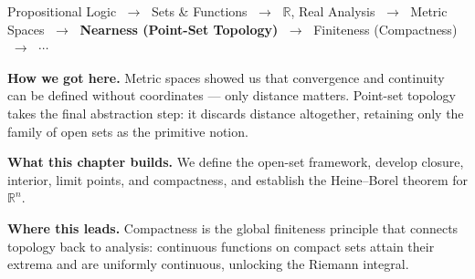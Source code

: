 
\begin{tcolorbox}[
  colback=gray!6,
  colframe=gray!40,
  arc=2pt,
  left=8pt, right=8pt, top=6pt, bottom=6pt,
  title={\small\textbf{Where You Are in the Journey}},
  fonttitle=\small\bfseries
]
\begin{center}
\small
Propositional Logic
$\;\to\;$ Sets \& Functions
$\;\to\;$ $\mathbb{R}$, Real Analysis
$\;\to\;$ Metric Spaces
$\;\to\;$ \textbf{Nearness (Point-Set Topology)}
$\;\to\;$ Finiteness (Compactness)
$\;\to\;$ $\cdots$
\end{center}

\medskip
\noindent\textbf{How we got here.}
Metric spaces showed us that convergence and continuity can be defined
without coordinates --- only distance matters.
Point-set topology takes the final abstraction step: it discards
distance altogether, retaining only the family of open sets
as the primitive notion.

\medskip
\noindent\textbf{What this chapter builds.}
We define the open-set framework, develop closure, interior, limit
points, and compactness, and establish the Heine--Borel theorem
for $\mathbb{R}^n$.

\medskip
\noindent\textbf{Where this leads.}
Compactness is the global finiteness principle that connects topology
back to analysis: continuous functions on compact sets attain their
extrema and are uniformly continuous, unlocking the Riemann integral.
\end{tcolorbox}
\vspace{1em}

